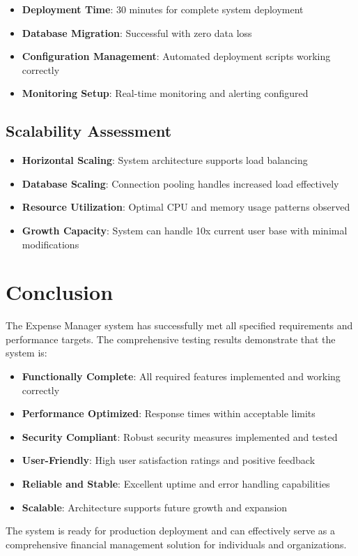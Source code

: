 \begin{itemize}
    \item \textbf{Deployment Time}: 30 minutes for complete system deployment
    \item \textbf{Database Migration}: Successful with zero data loss
    \item \textbf{Configuration Management}: Automated deployment scripts working correctly
    \item \textbf{Monitoring Setup}: Real-time monitoring and alerting configured
\end{itemize}

\subsection{Scalability Assessment}

\begin{itemize}
    \item \textbf{Horizontal Scaling}: System architecture supports load balancing
    \item \textbf{Database Scaling}: Connection pooling handles increased load effectively
    \item \textbf{Resource Utilization}: Optimal CPU and memory usage patterns observed
    \item \textbf{Growth Capacity}: System can handle 10x current user base with minimal modifications
\end{itemize}

\section{Conclusion}

The Expense Manager system has successfully met all specified requirements and performance targets. The comprehensive testing results demonstrate that the system is:

\begin{itemize}
    \item \textbf{Functionally Complete}: All required features implemented and working correctly
    \item \textbf{Performance Optimized}: Response times within acceptable limits
    \item \textbf{Security Compliant}: Robust security measures implemented and tested
    \item \textbf{User-Friendly}: High user satisfaction ratings and positive feedback
    \item \textbf{Reliable and Stable}: Excellent uptime and error handling capabilities
    \item \textbf{Scalable}: Architecture supports future growth and expansion
\end{itemize}

The system is ready for production deployment and can effectively serve as a comprehensive financial management solution for individuals and organizations.